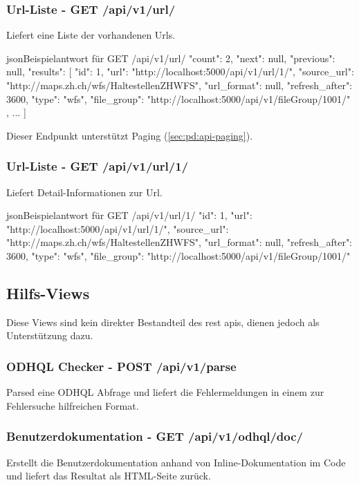 \subsubsection{Url-Liste - GET /api/v1/url/}
Liefert eine Liste der vorhandenen Urls.

\begin{srclst}{json}{Beispielantwort für GET /api/v1/url/}
{
    "count": 2, 
    "next": null, 
    "previous": null, 
    "results": [
        {
            "id": 1, 
            "url": "http://localhost:5000/api/v1/url/1/", 
            "source_url": "http://maps.zh.ch/wfs/HaltestellenZHWFS", 
            "url_format": null, 
            "refresh_after": 3600, 
            "type": "wfs", 
            "file_group": "http://localhost:5000/api/v1/fileGroup/1001/"
        }, 
        ...
    ]
}
\end{srclst}

Dieser Endpunkt unterstützt Paging (\cref{sec:pd:api-paging}).

\subsubsection{Url-Liste - GET /api/v1/url/1/}
Liefert Detail-Informationen zur Url.

\begin{srclst}{json}{Beispielantwort für GET /api/v1/url/1/}
{
    "id": 1, 
    "url": "http://localhost:5000/api/v1/url/1/", 
    "source_url": "http://maps.zh.ch/wfs/HaltestellenZHWFS", 
    "url_format": null, 
    "refresh_after": 3600, 
    "type": "wfs", 
    "file_group": "http://localhost:5000/api/v1/fileGroup/1001/"
}
\end{srclst}

\subsection{Hilfs-Views}
Diese Views sind kein direkter Bestandteil des \gls{rest} \acs{api}s, dienen jedoch als Unterstützung dazu.

\subsubsection{ODHQL Checker - POST /api/v1/parse} \label{sec:pd:api-parse}
Parsed eine ODHQL Abfrage und liefert die Fehlermeldungen in einem zur Fehlersuche hilfreichen Format.

\subsubsection{Benutzerdokumentation - GET /api/v1/odhql/doc/}
Erstellt die Benutzerdokumentation anhand von Inline-Dokumentation im Code und liefert das Resultat als HTML-Seite zurück.

